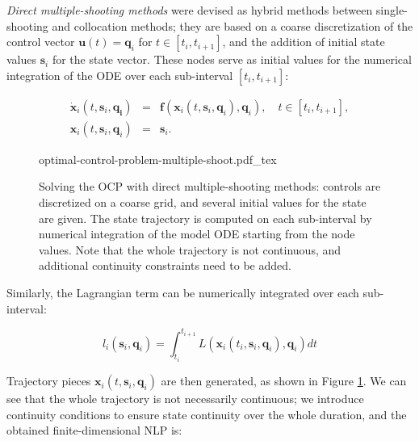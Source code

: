 \emph{Direct multiple-shooting methods} \cite{Bock1984} were devised
as hybrid methods between single-shooting and collocation methods;
they are based on a coarse discretization of the control vector
$\mathbf{u}(t)=\mathbf{q}_i$ for $t\in\left[t_i,t_{i+1}\right]$, and
the addition of initial state values $\mathbf{s}_i$ for the state
vector. These nodes serve as initial values for the numerical
integration of the ODE over each sub-interval $[t_i,t_{i+1}]$:

\begin{equation}
\begin{array}{rcl}
\dot{\mathbf{x}}_i(t,\mathbf{s}_i,\mathbf{q_i}) &=&
\mathbf{f}(\mathbf{x}_i(t,\mathbf{s}_i,\mathbf{q}_i),\mathbf{q}_i),
\quad t\in\left[t_i,t_{i+1}\right], \\
\mathbf{x}_i(t,\mathbf{s}_i,\mathbf{q}_i) &=& \mathbf{s}_i.
\end{array}
\end{equation} 

\begin{figure}
  \centering
      {\def\svgwidth{0.9\linewidth}
        
                   {optimal-control-problem-multiple-shoot.pdf_tex}
      }
      \caption{Solving the OCP with direct multiple-shooting methods:
        controls are discretized on a coarse grid, and several initial
        values for the state are given. The state trajectory is
        computed on each sub-interval by numerical integration of the
        model ODE starting from the node values. Note that the whole
        trajectory is not continuous, and additional continuity
        constraints need to be added.}
      \label{fig:chap3-optimal-control-problem-multiple-shoot}
\end{figure}

Similarly, the Lagrangian term can be numerically integrated over each
sub-interval:

\begin{equation}
l_i(\mathbf{s}_i,\mathbf{q}_i) =
\int_{t_i}^{t_{i+1}}L(\mathbf{x}_i(t_i,\mathbf{s}_i,\mathbf{q}_i),\mathbf{q}_i)dt
\end{equation}

Trajectory pieces $\mathbf{x}_i(t,\mathbf{s}_i,\mathbf{q}_i)$ are then
generated, as shown in Figure
\ref{fig:chap3-optimal-control-problem-multiple-shoot}. We can see
that the whole trajectory is not necessarily continuous; we introduce
continuity conditions to ensure state continuity over the whole
duration, and the obtained finite-dimensional NLP is:

